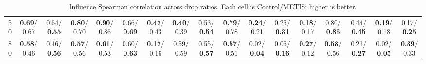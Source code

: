 \begin{table}[t]
{\begin{tabular}{c|cccc|cccc||cccc|cccc}
50 & \textbf{0.69}/0.67 & 0.54/\textbf{0.55} & \textbf{0.80}/0.70 & \textbf{0.90}/0.86 & 0.66/\textbf{0.69} & \textbf{0.47}/0.43 & \textbf{0.40}/0.39 & 0.53/\textbf{0.54} & \textbf{0.79}/0.78 & \textbf{0.24}/0.21 & 0.25/\textbf{0.31} & \textbf{0.18}/0.17 & 0.80/\textbf{0.86} & 0.44/\textbf{0.45} & \textbf{0.19}/0.18 & 0.17/\textbf{0.25} \\
80 & \textbf{0.58}/0.46 & 0.46/\textbf{0.56} & \textbf{0.57}/0.56 & \textbf{0.61}/0.53 & 0.60/\textbf{0.63} & \textbf{0.17}/0.16 & 0.59/0.59 & 0.55/\textbf{0.57} & \textbf{0.57}/0.51 & 0.02/\textbf{0.04} & 0.05/\textbf{0.16} & \textbf{0.27}/0.12 & \textbf{0.58}/0.56 & 0.21/\textbf{0.27} & 0.02/\textbf{0.05} & \textbf{0.39}/0.33 \\
\bottomrule
\end{tabular}%
}
\caption{Influence Spearman correlation across drop ratios. Each cell is Control/METIS; higher is better.}
\label{tab:partition_compare_spearman_ctrl_metis}
\end{table}

